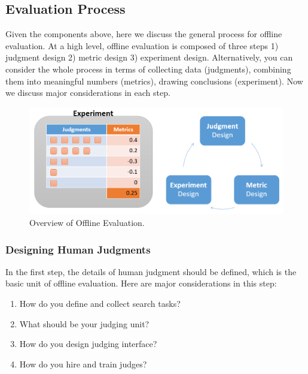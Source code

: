 \documentclass[openany]{now} %
\begin{document}
\subsection{Evaluation Process}
Given the components above, here we discuss the general process for offline evaluation. At a high level, offline evaluation is composed of three steps 1) judgment design 2) metric design 3) experiment design. Alternatively, you can consider the whole process in terms of collecting data (judgments), combining them into meaningful numbers (metrics), drawing conclusions (experiment). Now we discuss major considerations in each step.

\begin{figure}
	\begin{center}
		\includegraphics[scale=0.4]{images/offline_evaluation_overview}
		\caption{Overview of Offline Evaluation.} 
		\label{fig:offline_evaluation_overview}
	\end{center}
\end{figure}




\subsubsection{Designing Human Judgments}

In the first step, the details of human judgment should be defined, which is the basic unit of offline evaluation. Here are major considerations in this step:

\begin{enumerate}
	\item How do you define and collect search tasks?
	\item What should be your judging unit?
	\item How do you design judging interface?
	\item How do you hire and train judges?
\end{enumerate}
\end{document}
